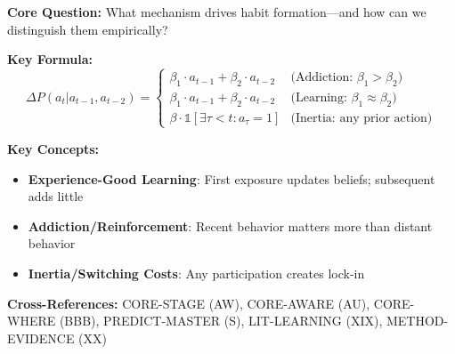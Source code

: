 \begin{tcolorbox}[colback=blue!5!white, colframe=blue!75!black,
    title=Quick Reference: Habit Formation Mechanisms]

\textbf{Core Question:} What mechanism drives habit formation---and how can we distinguish them empirically?

\textbf{Key Formula:}
\begin{equation}
\Delta P(a_t | a_{t-1}, a_{t-2}) = \begin{cases}
\beta_1 \cdot a_{t-1} + \beta_2 \cdot a_{t-2} & \text{(Addiction: } \beta_1 > \beta_2 \text{)} \\
\beta_1 \cdot a_{t-1} + \beta_2 \cdot a_{t-2} & \text{(Learning: } \beta_1 \approx \beta_2 \text{)} \\
\beta \cdot \mathbb{1}[\exists \tau < t: a_\tau = 1] & \text{(Inertia: any prior action)}
\end{cases}
\end{equation}

\textbf{Key Concepts:}
\begin{itemize}[nosep]
\item \textbf{Experience-Good Learning}: First exposure updates beliefs; subsequent adds little
\item \textbf{Addiction/Reinforcement}: Recent behavior matters more than distant behavior
\item \textbf{Inertia/Switching Costs}: Any participation creates lock-in
\end{itemize}

\textbf{Cross-References:} CORE-STAGE (AW), CORE-AWARE (AU), CORE-WHERE (BBB), PREDICT-MASTER (S), LIT-LEARNING (XIX), METHOD-EVIDENCE (XX)
\end{tcolorbox}


